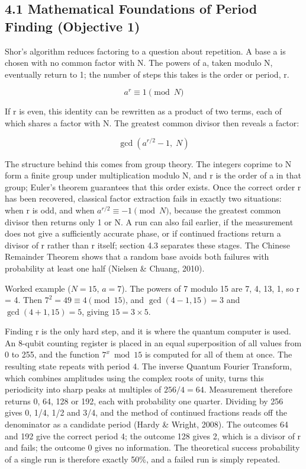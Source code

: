 \documentclass[12pt,oneside]{report}
\begin{document}
\subsection*{4.1 Mathematical Foundations of Period Finding (Objective 1)}

Shor's algorithm reduces factoring to a question about repetition. A base a is chosen with no common factor with N. The powers of a, taken modulo N, eventually return to 1; the number of steps this takes is the order or period, r.
\par

\[ a^{r} \equiv 1 \pmod{N} \]
\par

If r is even, this identity can be rewritten as a product of two terms, each of which shares a factor with N. The greatest common divisor then reveals a factor:
\par

\[ \gcd\left(a^{r/2} - 1,\; N\right) \]
\par

The structure behind this comes from group theory. The integers coprime to N form a finite group under multiplication modulo N, and r is the order of a in that group; Euler's theorem guarantees that this order exists. Once the correct order r has been recovered, classical factor extraction fails in exactly two situations: when r is odd, and when $a^{r/2} \equiv -1 \pmod{N}$, because the greatest common divisor then returns only 1 or N. A run can also fail earlier, if the measurement does not give a sufficiently accurate phase, or if continued fractions return a divisor of r rather than r itself; section 4.3 separates these stages. The Chinese Remainder Theorem shows that a random base avoids both failures with probability at least one half (Nielsen \& Chuang, 2010).
\par

Worked example ($N = 15$, $a = 7$). The powers of 7 modulo 15 are 7, 4, 13, 1, so r = 4. Then $7^{2} = 49 \equiv 4 \pmod{15}$, and $\gcd(4 - 1, 15) = 3$ and $\gcd(4 + 1, 15) = 5$, giving $15 = 3 \times 5$.
\par

Finding r is the only hard step, and it is where the quantum computer is used. An 8-qubit counting register is placed in an equal superposition of all values from 0 to 255, and the function $7^{x} \bmod 15$ is computed for all of them at once. The resulting state repeats with period 4. The inverse Quantum Fourier Transform, which combines amplitudes using the complex roots of unity, turns this periodicity into sharp peaks at multiples of $256/4 = 64$. Measurement therefore returns 0, 64, 128 or 192, each with probability one quarter. Dividing by 256 gives 0, 1/4, 1/2 and 3/4, and the method of continued fractions reads off the denominator as a candidate period (Hardy \& Wright, 2008). The outcomes 64 and 192 give the correct period 4; the outcome 128 gives 2, which is a divisor of r and fails; the outcome 0 gives no information. The theoretical success probability of a single run is therefore exactly 50\%, and a failed run is simply repeated.
\par
\end{document}

